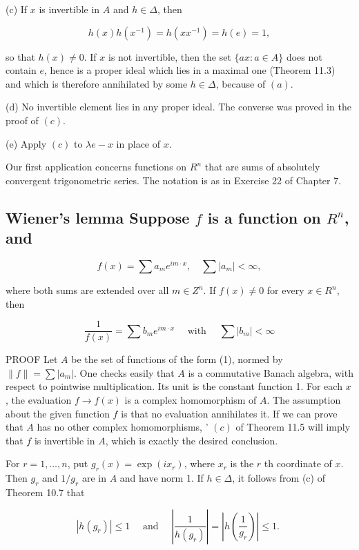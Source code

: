 \documentclass[10pt]{article}
\begin{document}
(c) If $x$ is invertible in $A$ and $h \in \Delta$, then

$$
h(x) h\left(x^{-1}\right)=h\left(x x^{-1}\right)=h(e)=1,
$$

so that $h(x) \neq 0$. If $x$ is not invertible, then the set $\{a x: a \in A\}$ does not contain $e$, hence is a proper ideal which lies in a maximal one (Theorem 11.3) and which is therefore annihilated by some $h \in \Delta$, because of $(a)$.

(d) No invertible element lies in any proper ideal. The converse was proved in the proof of $(c)$.

(e) Apply $(c)$ to $\lambda e-x$ in place of $x$.

Our first application concerns functions on $R^{n}$ that are sums of absolutely convergent trigonometric series. The notation is as in Exercise 22 of Chapter 7.

\subsection{Wiener's lemma Suppose $f$ is a function on $R^{n}$, and}
$$
f(x)=\sum a_{m} e^{i m \cdot x}, \quad \sum\left|a_{m}\right|<\infty,
$$

where both sums are extended over all $m \in Z^{n}$. If $f(x) \neq 0$ for every $x \in R^{n}$, then

$$
\frac{1}{f(x)}=\sum b_{m} e^{i m \cdot x} \quad \text { with } \quad \sum\left|b_{m}\right|<\infty
$$

PROOF Let $A$ be the set of functions of the form (1), normed by $\|f\|=\sum\left|a_{m}\right|$. One checks easily that $A$ is a commutative Banach algebra, with respect to pointwise multiplication. Its unit is the constant function 1. For each $x$, the evaluation $f \rightarrow f(x)$ is a complex homomorphism of $A$. The assumption about the given function $f$ is that no evaluation annihilates it. If we can prove that $A$ has no other complex homomorphisms, ' $(c)$ of Theorem 11.5 will imply that $f$ is invertible in $A$, which is exactly the desired conclusion.

For $r=1, \ldots, n$, put $g_{r}(x)=\exp \left(i x_{r}\right)$, where $x_{r}$ is the $r$ th coordinate of $x$. Then $g_{r}$ and $1 / g_{r}$ are in $A$ and have norm 1. If $h \in \Delta$, it follows from (c) of Theorem 10.7 that

$$
\left|h\left(g_{r}\right)\right| \leq 1 \quad \text { and } \quad\left|\frac{1}{h\left(g_{r}\right)}\right|=\left|h\left(\frac{1}{g_{r}}\right)\right| \leq 1 \text {. }
$$
\end{document}
